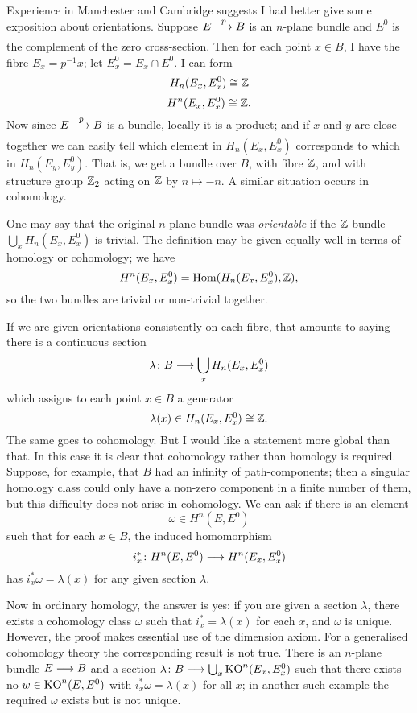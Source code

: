 \documentclass[../main]{subfiles}
\begin{document}
Experience in Manchester and Cambridge suggests I had better give some exposition about orientations. Suppose $E\lar{p} B$ is an $n$-plane bundle and $E^0$ is the complement of the zero cross-section. Then for each point $x \in B$, I have the fibre $E_x = p^{-1}x$; let $E^0_x= E_x \cap E^0$. I can form
\[H_n(E_x,E_x^0) \cong \mathbb{Z} \]
\[H^n(E_x, E_x^0) \cong \mathbb{Z}.\]
Now since $E \lar{p} B$ is a bundle, locally it is a product; and if $x$ and $y$ are close together we can easily tell which element in $H_n(E_x,E_x^0)$ corresponds to which in $H_n(E_y,E_y^0)$. That is, we get a bundle over $B$, with fibre $\mathbb{Z}$, and with structure group $\mathbb{Z}_2$ acting on $\mathbb{Z}$ by $n \mapsto -n$. A similar situation occurs in cohomology.

One may say that the original $n$-plane bundle was \emph{orientable} if the $\mathbb{Z}$-bundle $\bigcup_x H_n(E_x,E_x^0)$ is trivial. The definition may be given equally well in terms of homology or cohomology; we have
\[H^n(E_x,E_x^0) = \operatorname{Hom}(H_n(E_x,E_x^0),\mathbb{Z}),\]
so the two bundles are trivial or non-trivial together.

If we are given orientations consistently on each fibre, that amounts to saying there is a continuous section
\[\lambda \colon B \longrightarrow \bigcup_x H_n(E_x,E_x^0)\]
which assigns to each point $x \in B$ a generator 
\[\lambda(x) \in H_n(E_x,E_x^0) \cong \mathbb{Z}.\]
The same goes to cohomology. But I would like a statement more global than that. In this case it is clear that cohomology rather than homology is required. Suppose, for example, that $B$ had an infinity of path-components; then a singular homology class could only have a non-zero component in a finite number of them, but this difficulty does not arise in cohomology. We can ask if there is an element 
\[\omega \in H^n(E,E^0)\]
such that for each $x \in B$, the induced homomorphism 
\[i_x^* \colon H^n(E,E^0) \longrightarrow H^n(E_x,E_x^0)\]
has $i_x^* \omega = \lambda(x)$ for any given section $\lambda$.

Now in ordinary homology, the answer is yes: if you are given a section $\lambda$, there exists a cohomology class $\omega$ such that $i_x^* = \lambda(x)$ for each $x$, and $\omega$ is unique. However, the proof makes essential use of the dimension axiom. For a generalised cohomology theory the corresponding result is not true. There is an $n$-plane bundle $E \longrightarrow B$ and a section $\lambda \colon B \longrightarrow \bigcup_x \mathrm{KO}^n(E_x,E_x^0)$ such that there exists no $w \in \mathrm{KO}^n(E,E^0)$ with $i_x^* \omega = \lambda(x)$ for all $x$; in another such example the required $\omega$ exists but is not unique.
\end{document}
